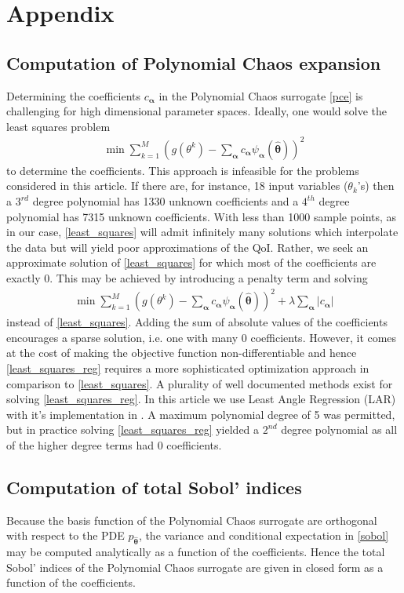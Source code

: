 \section*{Appendix}

\subsection*{Computation of Polynomial Chaos expansion}
Determining the coefficients $c_{\boldsymbol{\alpha}}$ in the Polynomial Chaos surrogate \eqref{pce} is challenging for high dimensional parameter spaces. Ideally, one would solve the least squares problem
\begin{eqnarray}
\label{least_squares}
\min \sum\limits_{k=1}^M \left(g(\theta^k)-\sum_{\boldsymbol{\alpha}} c_{\boldsymbol{\alpha}} \psi_{\boldsymbol{\alpha}}(\hat{\boldsymbol{\theta}}) \right)^2
\end{eqnarray}
to determine the coefficients. This approach is infeasible for the problems considered in this article. If there are, for instance, 18 input variables ($\theta_k$'s) then a $3^{rd}$ degree polynomial has 1330 unknown coefficients and a $4^{th}$ degree polynomial has 7315 unknown coefficients. With less than 1000 sample points, as in our case, \eqref{least_squares} will admit infinitely many solutions which interpolate the data but will yield poor approximations of the QoI. Rather, we seek an approximate solution of \eqref{least_squares} for which most of the coefficients are exactly 0. This may be achieved by introducing a penalty term and solving
\begin{eqnarray}
\label{least_squares_reg}
\min \sum\limits_{k=1}^M \left(g(\theta^k)-\sum_{\boldsymbol{\alpha}} c_{\boldsymbol{\alpha}} \psi_{\boldsymbol{\alpha}}(\hat{\boldsymbol{\theta}}) \right)^2 + \lambda \sum_{\boldsymbol{\alpha}} \vert c_{\boldsymbol{\alpha}} \vert
\end{eqnarray}
instead of \eqref{least_squares}. Adding the sum of absolute values of the coefficients encourages a sparse solution, i.e. one with many 0 coefficients. However, it comes at the cost of making the objective function non-differentiable and hence \eqref{least_squares_reg} requires a more sophisticated optimization approach in comparison to \eqref{least_squares}. A plurality of well documented methods exist for solving \eqref{least_squares_reg}. In this article we use Least Angle Regression (LAR) \cite{lar} with it's implementation in \cite{uqlab}. A maximum polynomial degree of 5 was permitted, but in practice solving \eqref{least_squares_reg} yielded a $2^{nd}$ degree polynomial as all of the higher degree terms had 0 coefficients.

\subsection*{Computation of total Sobol' indices}
Because the basis function of the Polynomial Chaos surrogate are orthogonal with respect to the PDE $p_{\hat{\boldsymbol{\theta}}}$, the variance and conditional expectation in \eqref{sobol} may be computed analytically as a function of the coefficients. Hence the total Sobol' indices of the Polynomial Chaos surrogate are given in closed form as a function of the coefficients.